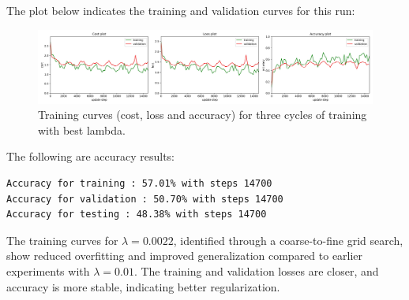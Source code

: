 \documentclass[11pt]{article}
\begin{document}
The plot below indicates the training and validation curves for this run:
\begin{figure}[H]
    \centering
    \includegraphics[width=1\textwidth]{cyclic_training_curves_ex5.jpg}
    \caption{Training curves (cost, loss and accuracy) for three cycles of training with best lambda.}
    \label{fig:best_lambda_curves}
\end{figure}

The following are accuracy results:
\begin{lstlisting}[caption={Training and validation accuracy for best lambda}, label={lst:best_lambda_accuracy}]
Accuracy for training : 57.01% with steps 14700
Accuracy for validation : 50.70% with steps 14700
Accuracy for testing : 48.38% with steps 14700
\end{lstlisting}

The training curves for \( \lambda = 0.0022 \), identified through a coarse-to-fine grid search, show reduced overfitting and improved generalization compared to earlier experiments with \(\lambda = 0.01 \).
The training and validation losses are closer, and accuracy is more stable, indicating better regularization.
\end{document}
